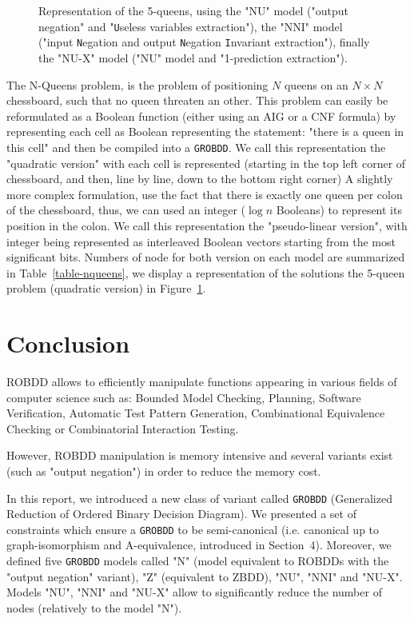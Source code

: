\documentclass[a4paper,10pt]{article}
\newcommand{\includeframe}[4]{\makebox[#2\linewidth]{\texttt{[image: \#4]}}}
\newcommand{\Uextract}{"\texttt{U}seless variables extraction"}
\newcommand{\NNIextract}{"input \texttt{N}egation and output \texttt{N}egation \texttt{I}nvariant extraction"}
\newcommand{\Xextract}{"1-prediction extraction"}
\newcommand{\GroBdd}{\texttt{GROBDD}}
\begin{document}
\begin{figure}
\center
\includeframe{1}{0.9}{}{nqueens.pdf}
\caption{Representation of the 5-queens, using the "NU" model ("output negation" and \Uextract), the "NNI" model (\NNIextract), finally the "NU-X" model ("NU" model and \Xextract).}
\label{figure-nqueens}
\end{figure}

The N-Queens problem, is the problem of positioning $N$ queens on an $N\times N$ chessboard, such that no queen threaten an other.
This problem can easily be reformulated as a Boolean function (either using an AIG or a CNF formula) by representing each cell as Boolean representing the statement: "there is a queen in this cell" and then be compiled into a \GroBdd{}.
We call this representation the "quadratic version" with each cell is represented (starting in the top left corner of chessboard, and then, line by line, down to the bottom right corner)
A slightly more complex formulation, use the fact that there is exactly one queen per colon of the chessboard, thus, we can used an integer ($\log n$ Booleans) to represent its position in the colon.
We call this representation the "pseudo-linear version", with integer being represented as interleaved Boolean vectors starting from the most significant bits.
Numbers of node for both version on each model are summarized in Table~\ref{table-nqueens}, we display a representation of the solutions the 5-queen problem (quadratic version) in Figure~\ref{figure-nqueens}.



\section{Conclusion}

ROBDD allows to efficiently manipulate functions appearing in various fields of computer science such as: Bounded Model Checking, Planning, Software Verification, Automatic Test Pattern Generation, Combinational Equivalence Checking or Combinatorial Interaction Testing.

However, ROBDD manipulation is memory intensive and several variants exist (such as "output negation") in order to reduce the memory cost.

In this report, we introduced a new class of variant called \GroBdd{} (Generalized Reduction of Ordered Binary Decision Diagram).
We presented a set of constraints which ensure a \GroBdd{} to be semi-canonical (i.e. canonical up to graph-isomorphism and A-equivalence, introduced in Section~4).
Moreover, we defined five \GroBdd{} models called "N" (model equivalent to ROBDDs with the "output negation" variant), "Z" (equivalent to ZBDD), "NU", "NNI" and "NU-X".
Models "NU", "NNI" and "NU-X" allow to significantly reduce the number of nodes (relatively to the model "N").
\end{document}
